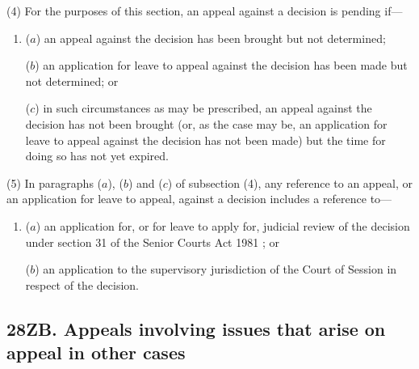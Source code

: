 \documentclass[12pt,a4paper]{article}
\begin{document}
(4) For the purposes of this section, an appeal against a decision is pending if—
\begin{enumerate}\item[]
($a$) an appeal against the decision has been brought but not determined;

($b$) an application for leave to appeal against the decision has been made but not determined; or

($c$) in such circumstances as may be prescribed, an appeal against the decision has not been brought (or, as the case may be, an application for leave to appeal against the decision has not been made) but the time for doing so has not yet expired.
\end{enumerate}

(5) In paragraphs ($a$), ($b$) and ($c$) of subsection (4), any reference to an appeal, or an application for leave to appeal, against a decision includes a reference to—
\begin{enumerate}\item[]
($a$) an application for, or for leave to apply for, judicial review of the decision under section 31 of the 
Senior Courts Act 1981%
; or

($b$) an application to the supervisory jurisdiction of the Court of Session in respect of the decision.
\end{enumerate}


\subsection{28ZB. Appeals involving issues that arise on appeal in other cases}
\end{document}
